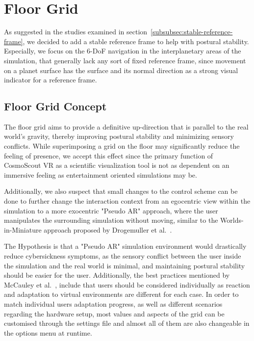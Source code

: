 \section{Floor Grid}\label{sec:floor-grid}

As suggested in the studies examined in section~\ref{subsubsec:stable-reference-frame}, we decided to add a stable
reference frame to help with postural stability.
Especially, we focus on the 6-DoF navigation in the interplanetary areas of the simulation, that generally lack any
sort of fixed reference frame, since movement on a planet surface has the surface and its normal direction as a
strong visual indicator for a reference frame.


\subsection{Floor Grid Concept}\label{subsec:floor-grid-concept}

The floor grid aims to provide a definitive up-direction that is parallel to the real world's gravity, thereby
improving postural stability and minimizing sensory conflicts.
While superimposing a grid on the floor may significantly reduce the feeling of presence, we accept this effect since
the primary function of CosmoScout VR as a scientific visualization tool is not as dependent on an immersive feeling
as entertainment oriented simulations may be.

Additionally, we also suspect that small changes to the control scheme can be done to further change the interaction
context from an egocentric view within the simulation to a more exocentric "Pseudo AR" approach, where the user
manipulates the surrounding simulation without moving, similar to the Worlds-in-Miniature approach proposed
by Drogemuller et al.~\cite{Drogemuller2020}.

The Hypothesis is that a "Pseudo AR" simulation environment would drastically reduce cybersickness symptoms, as the
sensory conflict between the user inside the simulation and the real world is minimal, and maintaining postural
stability should be easier for the user.
Additionally, the best practices mentioned by McCauley et al.~\cite{McCauley1992}, include that users should be
considered individually as reaction and adaptation to virtual environments are different for each case.
In order to match individual users adaptation progress, as well as different scenarios regarding the hardware setup,
most values and aspects of the grid can be customised through the settings file and almost all of them are also
changeable in the options menu at runtime.

